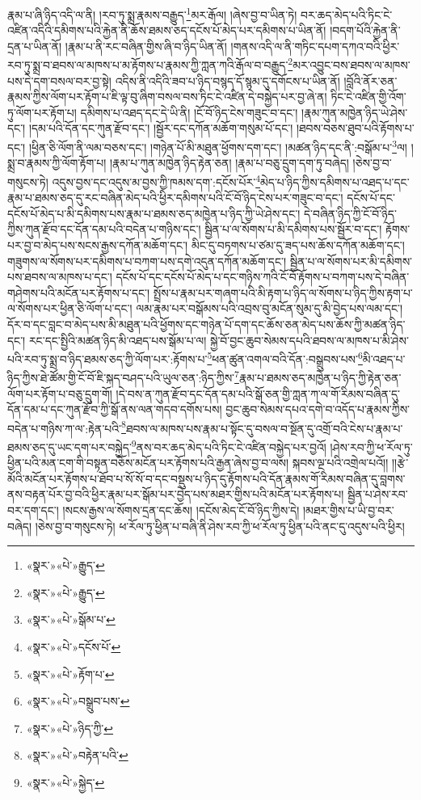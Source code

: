 རྣམ་པ་ཞི་ཉིད་འདི་ལ་ནི། །རབ་ཏུ་སྨྲ་རྣམས་བརྒྱུད་\footnote{«སྣར་»«པེ་»རྒྱུད་}མར་རྒོལ། །ཞེས་བྱ་བ་ཡིན་ཏེ། བར་ཆད་མེད་པའི་ཏིང་ངེ་འཛིན་འདིའི་དམིགས་པའི་རྐྱེན་ནི་ཆོས་ཐམས་ཅད་དངོས་པོ་མེད་པར་དམིགས་པ་ཡིན་ནོ། །བདག་པོའི་རྐྱེན་ནི་དྲན་པ་ཡིན་ནོ། །རྣམ་པ་ནི་རང་བཞིན་གྱིས་ཞི་བ་ཉིད་ཡིན་ནོ། །གནས་འདི་ལ་ནི་གཏིང་དཔག་དཀའ་བའི་ཕྱིར་རབ་ཏུ་སྨྲ་བ་ཐབས་ལ་མཁས་པ་མ་རྟོགས་པ་རྣམས་ཀྱི་ཀླན་ཀའི་རྒོལ་བ་བརྒྱུད་\footnote{«སྣར་»«པེ་»རྒྱུད་}མར་འབྱུང་བས་ཐབས་ལ་མཁས་པས་དེ་དག་བསལ་བར་བྱ་སྟེ། འདིས་ནི་འདིའི་ཟབ་པ་ཉིད་བསྙད་དོ་སྙམ་དུ་དགོངས་པ་ཡིན་ནོ། །བློའི་ནོར་ཅན་རྣམས་ཀྱིས་ལོག་པར་རྟོག་པ་ཇི་ལྟ་བུ་ཞིག་བསལ་བས་ཏིང་ངེ་འཛིན་དེ་བསྐྱེད་པར་བྱ་ཞེ་ན། ཏིང་ངེ་འཛིན་གྱི་འོག་ཏུ་ལོག་པར་རྟོག་པ། དམིགས་པ་འཐད་དང་དེ་ཡི་ནི། །ངོ་བོ་ཉིད་ངེས་གཟུང་བ་དང་། །རྣམ་ཀུན་མཁྱེན་ཉིད་ཡེ་ཤེས་དང་། །དམ་པའི་དོན་དང་ཀུན་རྫོབ་དང་། །སྦྱོར་དང་དཀོན་མཆོག་གསུམ་པོ་དང་། །ཐབས་བཅས་ཐུབ་པའི་རྟོགས་པ་དང་། །ཕྱིན་ཅི་ལོག་ནི་ལམ་བཅས་དང་། །གཉེན་པོ་མི་མཐུན་ཕྱོགས་དག་དང་། །མཚན་ཉིད་དང་ནི་:བསྒོམ་པ་\footnote{«སྣར་»«པེ་»སྒོམ་པ་}ལ། །སྨྲ་བ་རྣམས་ཀྱི་ལོག་རྟོག་པ། །རྣམ་པ་ཀུན་མཁྱེན་ཉིད་རྟེན་ཅན། །རྣམ་པ་བཅུ་དྲུག་དག་ཏུ་བཞེད། །ཅེས་བྱ་བ་གསུངས་ཏེ། འདུས་བྱས་དང་འདུས་མ་བྱས་ཀྱི་ཁམས་དག་:དངོས་པོར་\footnote{«སྣར་»«པེ་»དངོས་པོ་}མེད་པ་ཉིད་ཀྱིས་དམིགས་པ་འཐད་པ་དང་རྣམ་པ་ཐམས་ཅད་དུ་རང་བཞིན་མེད་པའི་ཕྱིར་དམིགས་པའི་ངོ་བོ་ཉིད་ངེས་པར་གཟུང་བ་དང་། དངོས་པོ་དང་དངོས་པོ་མེད་པ་མི་དམིགས་པས་རྣམ་པ་ཐམས་ཅད་མཁྱེན་པ་ཉིད་ཀྱི་ཡེ་ཤེས་དང་། དེ་བཞིན་ཉིད་ཀྱི་ངོ་བོ་ཉིད་ཀྱིས་ཀུན་རྫོབ་དང་དོན་དམ་པའི་བདེན་པ་གཉིས་དང་། སྦྱིན་པ་ལ་སོགས་པ་མི་དམིགས་པས་སྦྱོར་བ་དང་། རྟོགས་པར་བྱ་བ་མེད་པས་སངས་རྒྱས་དཀོན་མཆོག་དང་། མིང་དུ་བཏགས་པ་ཙམ་དུ་ཟད་པས་ཆོས་དཀོན་མཆོག་དང་། གཟུགས་ལ་སོགས་པར་དམིགས་པ་བཀག་པས་དགེ་འདུན་དཀོན་མཆོག་དང་། སྦྱིན་པ་ལ་སོགས་པར་མི་དམིགས་པས་ཐབས་ལ་མཁས་པ་དང་། དངོས་པོ་དང་དངོས་པོ་མེད་པ་དང་གཉིས་ཀའི་ངོ་བོ་རྟོགས་པ་བཀག་པས་དེ་བཞིན་གཤེགས་པའི་མངོན་པར་རྟོགས་པ་དང་། སྤྲོས་པ་རྣམ་པར་གཞག་པའི་མི་རྟག་པ་ཉིད་ལ་སོགས་པ་ཉིད་ཀྱིས་རྟག་པ་ལ་སོགས་པར་ཕྱིན་ཅི་ལོག་པ་དང་། ལམ་རྣམ་པར་བསྒོམས་པའི་འབྲས་བུ་མངོན་སུམ་དུ་མི་བྱེད་པས་ལམ་དང་། དོར་བ་དང་བླང་བ་མེད་པས་མི་མཐུན་པའི་ཕྱོགས་དང་གཉེན་པོ་དག་དང་ཆོས་ཅན་མེད་པས་ཆོས་ཀྱི་མཚན་ཉིད་དང་། རང་དང་སྤྱིའི་མཚན་ཉིད་མི་འཐད་པས་སྒོམ་པ་ལ། སྐྱེ་བོ་བྱང་ཆུབ་སེམས་དཔའི་ཐབས་ལ་མཁས་པ་མི་ཤེས་པའི་རབ་ཏུ་སྨྲ་བ་ཉིད་ཐམས་ཅད་ཀྱི་ལོག་པར་:རྟོགས་པ་\footnote{«སྣར་»«པེ་»རྟོག་པ་}ཕན་ཚུན་འགལ་བའི་དོན་:བསྒྲུབས་པས་\footnote{«སྣར་»«པེ་»བསྒྲུབ་པས་}མི་འཐད་པ་ཉིད་ཀྱིས་ཐེ་ཚོམ་གྱི་ངོ་བོ་ཇི་སྐད་བཤད་པའི་ཡུལ་ཅན་:ཉིད་ཀྱིས་\footnote{«སྣར་»«པེ་»ཉིད་ཀྱི་}རྣམ་པ་ཐམས་ཅད་མཁྱེན་པ་ཉིད་ཀྱི་རྟེན་ཅན་ལོག་པར་རྟོག་པ་བཅུ་དྲུག་གོ། །དེ་བས་ན་ཀུན་རྫོབ་དང་དོན་དམ་པའི་སྒོ་ཅན་གྱི་ཀླན་ཀ་ལ་གོ་རིམས་བཞིན་དུ་དོན་དམ་པ་དང་ཀུན་རྫོབ་ཀྱི་སྒོ་ནས་ལན་གདབ་དགོས་པས། བྱང་ཆུབ་སེམས་དཔའ་དགེ་བ་འདོད་པ་རྣམས་ཀྱིས་བདེན་པ་གཉིས་ཀ་ལ་:རྟེན་པའི་\footnote{«སྣར་»«པེ་»བརྟེན་པའི་}ཐབས་ལ་མཁས་པས་རྣམ་པ་སྟོང་དུ་བསལ་བ་སྔོན་དུ་འགྲོ་བའི་ངེས་པ་རྣམ་པ་ཐམས་ཅད་དུ་ཡང་དག་པར་བསྐྱེད་\footnote{«སྣར་»«པེ་»སྐྱེད་}ནས་བར་ཆད་མེད་པའི་ཏིང་ངེ་འཛིན་བསྐྱེད་པར་བྱའོ། །ཤེས་རབ་ཀྱི་ཕ་རོལ་ཏུ་ཕྱིན་པའི་མན་ངག་གི་བསྟན་བཅོས་མངོན་པར་རྟོགས་པའི་རྒྱན་ཞེས་བྱ་བ་ལས། སྐབས་ལྔ་པའི་འགྲེལ་པའོ།། །།རྩེ་མོའི་མངོན་པར་རྟོགས་པ་ཐོབ་པ་སོ་སོ་བ་དང་བསྡུས་པ་ཉིད་དུ་རྟོགས་པའི་དོན་རྣམས་གོ་རིམས་བཞིན་དུ་བླགས་ནས་བརྟན་པོར་བྱ་བའི་ཕྱིར་རྣམ་པར་སྒོམ་པར་བྱེད་པས་མཐར་གྱིས་པའི་མངོན་པར་རྟོགས་པ། སྦྱིན་པ་ཤེས་རབ་བར་དག་དང་། །སངས་རྒྱས་ལ་སོགས་དྲན་དང་ཆོས། །དངོས་མེད་ངོ་བོ་ཉིད་ཀྱིས་དེ། །མཐར་གྱིས་པ་ཡི་བྱ་བར་བཞེད། །ཅེས་བྱ་བ་གསུངས་ཏེ། ཕ་རོལ་ཏུ་ཕྱིན་པ་བཞི་ནི་ཤེས་རབ་ཀྱི་ཕ་རོལ་ཏུ་ཕྱིན་པའི་ནང་དུ་འདུས་པའི་ཕྱིར། 